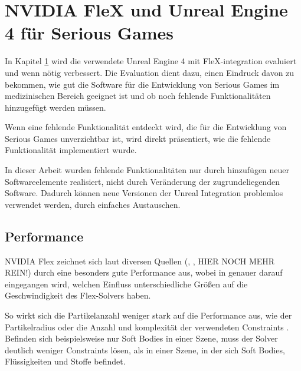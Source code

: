 \chapter{NVIDIA FleX und Unreal Engine 4 für Serious Games}
\label{chap_Flex_Engine}

In Kapitel \ref{chap_Flex_Engine} wird die verwendete Unreal Engine 4 mit FleX-integration evaluiert und wenn nötig verbessert. Die Evaluation dient dazu, einen Eindruck davon zu bekommen, wie gut die Software für die Entwicklung von Serious Games im medizinischen Bereich geeignet ist und ob noch fehlende Funktionalitäten hinzugefügt werden müssen. 

Wenn eine fehlende Funktionalität entdeckt wird, die für die Entwicklung von Serious Games unverzichtbar ist, wird direkt präsentiert, wie die fehlende Funktionalität implementiert wurde.

In dieser Arbeit wurden fehlende Funktionalitäten nur durch hinzufügen neuer Softwareelemente realisiert, nicht durch Veränderung der zugrundeliegenden Software. Dadurch können neue Versionen der Unreal Integration problemlos verwendet werden, durch einfaches Austauschen. 


\section{Performance}


NVIDIA Flex zeichnet sich laut diversen Quellen (\cite{FlexD3D}, \cite{UPP}, HIER NOCH MEHR REIN!) durch eine besonders gute Performance aus, wobei in \cite{FlexD3D} genauer darauf eingegangen wird, welchen Einfluss unterschiedliche Größen auf die Geschwindigkeit des Flex-Solvers haben. 

So wirkt sich die Partikelanzahl weniger stark auf die Performance aus, wie der Partikelradius oder die Anzahl und komplexität der verwendeten Constraints \cite{FlexD3D}. Befinden sich beispielsweise nur Soft Bodies in einer Szene, muss der Solver deutlich weniger Constraints lösen, als in einer Szene, in der sich Soft Bodies, Flüssigkeiten und Stoffe befindet.

